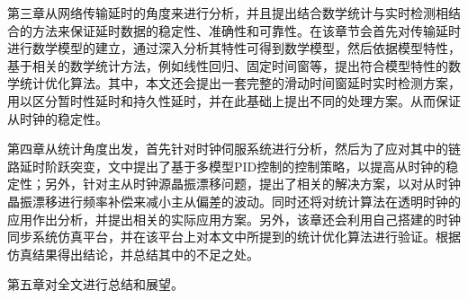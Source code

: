 第三章从网络传输延时的角度来进行分析，并且提出结合数学统计与实时检测相结合的方法来保证延时数据的稳定性、准确性和可靠性。在该章节会首先对传输延时进行数学模型的建立，通过深入分析其特性可得到数学模型，然后依据模型特性，基于相关的数学统计方法，例如线性回归、固定时间窗等，提出符合模型特性的数学统计优化算法。其中，本文还会提出一套完整的滑动时间窗延时实时检测方案，用以区分暂时性延时和持久性延时，并在此基础上提出不同的处理方案。从而保证从时钟的稳定性。

第四章从统计角度出发，首先针对时钟伺服系统进行分析，然后为了应对其中的链路延时阶跃突变，文中提出了基于多模型PID控制的控制策略，以提高从时钟的稳定性；另外，针对主从时钟源晶振漂移问题，提出了相关的解决方案，以对从时钟晶振漂移进行频率补偿来减小主从偏差的波动。同时还将对统计算法在透明时钟的应用作出分析，并提出相关的实际应用方案。另外，该章还会利用自己搭建的时钟同步系统仿真平台，并在该平台上对本文中所提到的统计优化算法进行验证。根据仿真结果得出结论，并总结其中的不足之处。

第五章对全文进行总结和展望。
